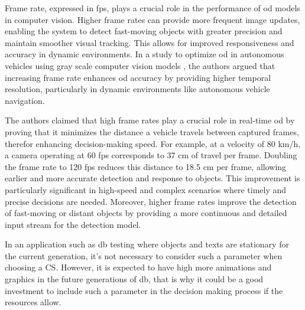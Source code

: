 Frame rate, expressed in \gls{fps}, plays a crucial role in the performance of \gls{od} models in computer vision. Higher frame rates can provide more frequent image updates, enabling the system to detect fast-moving objects with greater precision and maintain smoother visual tracking. This allows for improved responsiveness and accuracy in dynamic environments. In a study to optimize \gls{od} in autonomous vehicles using gray scale computer vision models \cite{FPS}, the authors argued that increasing frame rate enhances \gls{od} accuracy by providing higher temporal resolution, particularly in dynamic environments like autonomous vehicle navigation.

The authors claimed that high frame rates play a crucial role in real-time \gls{od} by proving that it  minimizes the distance a vehicle travels between captured frames, therefor enhancing decision-making speed. For example, at a velocity of 80 km/h, a camera operating at 60 \gls{fps} corresponds to 37 cm of travel per frame. Doubling the frame rate to 120 \gls{fps} reduces this distance to 18.5 cm per frame, allowing earlier and more accurate detection and response to objects. This improvement is particularly significant in high-speed and complex scenarios where timely and precise decisions are needed. Moreover, higher frame rates improve the detection of fast-moving or distant objects by providing a more continuous and detailed input stream for the detection model.

In an application such as \gls{db} testing where objects and texts are stationary for the current generation, it's not necessary to consider such a parameter when choosing a CS. However, it is expected to have high more animations and graphics in the future generations of \gls{db}, that is why it could be a good investment to include such a parameter in the decision making process if the resources allow.


